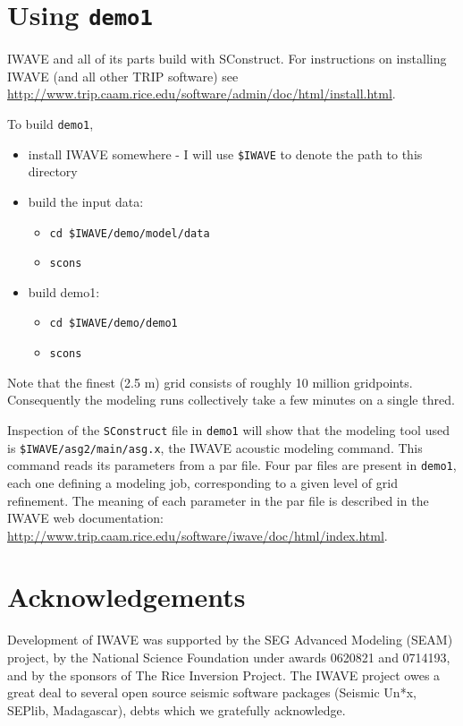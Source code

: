 \section{Using {\tt demo1}}
IWAVE and all of its parts build with SConstruct. For instructions on
installing IWAVE (and all other TRIP software) see 
\url{http://www.trip.caam.rice.edu/software/admin/doc/html/install.html}.

To build {\tt demo1},
\begin{itemize}
\item install IWAVE somewhere - I will use  {\tt \$IWAVE} to denote
  the path to this directory  
\item build the input data:
\begin{itemize} 
  \item {\tt cd \$IWAVE/demo/model/data}
\item {\tt scons}
\end{itemize}
\item build demo1:
\begin{itemize}
\item {\tt cd \$IWAVE/demo/demo1}
\item {\tt scons}
\end{itemize}
\end{itemize}
Note that the finest (2.5 m) grid consists of roughly 10 million
gridpoints. Consequently the modeling runs collectively take a few
minutes on a single thred.

Inspection of the {\tt SConstruct} file in {\tt demo1} will show that
the modeling tool used is {\tt \$IWAVE/asg2/main/asg.x}, the IWAVE
acoustic modeling command. This command reads its parameters from a
par file. Four par files are present in {\tt demo1}, each one defining
a modeling job, corresponding to a given level of grid refinement. The
meaning of each parameter in the par file is described in the IWAVE
web documentation: \url{http://www.trip.caam.rice.edu/software/iwave/doc/html/index.html}.

\section{Acknowledgements}
Development of IWAVE was supported by the SEG Advanced Modeling (SEAM) project, by the National Science Foundation under awards 0620821 and 0714193, and by the sponsors of The Rice Inversion Project. The IWAVE project owes a great deal to several open source seismic software packages (Seismic Un*x, SEPlib, Madagascar), debts which we gratefully acknowledge.
 

